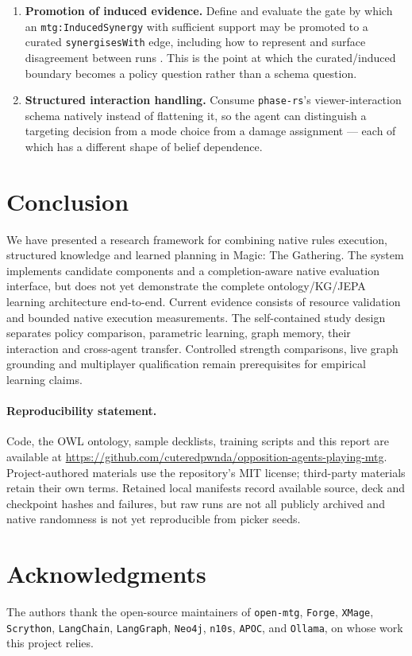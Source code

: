 \documentclass[11pt,a4paper]{article}
\theoremstyle{definition}
\theoremstyle{plain}
\begin{document}
\begin{enumerate}[leftmargin=1.2em, itemsep=1pt]
  \item \textbf{Promotion of induced evidence.} Define and evaluate the gate by which an \texttt{mtg:InducedSynergy} with sufficient support may be promoted to a curated \texttt{synergisesWith} edge, including how to represent and surface disagreement between runs \citep{ehrenmuller2026sock}. This is the point at which the curated/induced boundary becomes a policy question rather than a schema question.
  \item \textbf{Structured interaction handling.} Consume \texttt{phase-rs}'s viewer-interaction schema natively instead of flattening it, so the agent can distinguish a targeting decision from a mode choice from a damage assignment --- each of which has a different shape of belief dependence.
\end{enumerate}

\section{Conclusion}
\label{sec:concl}
We have presented a research framework for combining native rules execution, structured knowledge and learned planning in Magic: The Gathering. The system implements candidate components and a completion-aware native evaluation interface, but does not yet demonstrate the complete ontology/KG/JEPA learning architecture end-to-end. Current evidence consists of resource validation and bounded native execution measurements. The self-contained study design separates policy comparison, parametric learning, graph memory, their interaction and cross-agent transfer. Controlled strength comparisons, live graph grounding and multiplayer qualification remain prerequisites for empirical learning claims.

\paragraph{Reproducibility statement.} Code, the OWL ontology, sample decklists, training scripts and this report are available at \url{https://github.com/cuteredpwnda/opposition-agents-playing-mtg}. Project-authored materials use the repository's MIT license; third-party materials retain their own terms. Retained local manifests record available source, deck and checkpoint hashes and failures, but raw runs are not all publicly archived and native randomness is not yet reproducible from picker seeds.

\section*{Acknowledgments}
\noindent The authors thank the open-source maintainers of \texttt{open-mtg}, \texttt{Forge}, \texttt{XMage}, \texttt{Scrython}, \texttt{LangChain}, \texttt{LangGraph}, \texttt{Neo4j}, \texttt{n10s}, \texttt{APOC}, and \texttt{Ollama}, on whose work this project relies.



\end{document}
